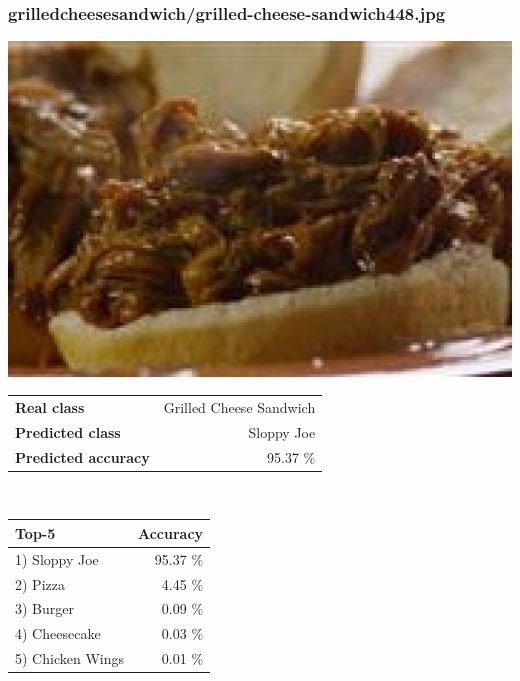 \subsubsection{grilled\textunderscore cheese\textunderscore sandwich/grilled-cheese-sandwich448.jpg}

\begin{minipage}[t]{0.4\textwidth}
	\vspace{0pt}
	\includegraphics[width=\linewidth]{images/evaluation-images/grilled_cheese_sandwich/grilled-cheese-sandwich448.jpg}
\end{minipage}
\hfill
\begin{minipage}[t]{0.5\textwidth}
	\vspace{0pt}\raggedright
	\begin{tabularx}{\textwidth}{X r}
		\small \textbf{Real class} & \small Grilled Cheese Sandwich\\
		\small \textbf{Predicted class} & \small Sloppy Joe\\
		\small \textbf{Predicted accuracy} & \small 95.37 \%
    \end{tabularx}\\
    
    \vspace{6pt}
	\begin{tabularx}{\textwidth}{X r}
        \small \textbf{Top-5} & \small \textbf{Accuracy} \\
        \hline
		\small 1) Sloppy Joe & \small 95.37 \%\\\small 2) Pizza & \small 4.45 \%\\\small 3) Burger & \small 0.09 \%\\\small 4) Cheesecake & \small 0.03 \%\\\small 5) Chicken Wings & \small 0.01 \%
    \end{tabularx}
\end{minipage}
    
